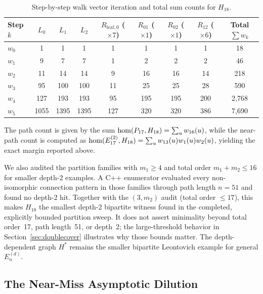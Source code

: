 \begin{table}[H]
\centering
\caption{Step-by-step walk vector iteration and total sum counts for $H_{18}$.}
\label{tab:walk_h18}
\begin{tabular}{lcccccccc}
  \toprule
  Step $k$ & $L_0$ & $L_1$ & $L_2$ & $R_{\mathrm{leaf},0}$ ($\times 7$) & $R_{01}$ ($\times 1$) & $R_{02}$ ($\times 1$) & $R_{12}$ ($\times 6$) & Total $\sum w_k$ \\
  \midrule
  $w_0$ & 1 & 1 & 1 & 1 & 1 & 1 & 1 & 18 \\
  $w_1$ & 9 & 7 & 7 & 1 & 2 & 2 & 2 & 46 \\
  $w_2$ & 11 & 14 & 14 & 9 & 16 & 16 & 14 & 218 \\
  $w_3$ & 95 & 100 & 100 & 11 & 25 & 25 & 28 & 590 \\
  $w_4$ & 127 & 193 & 193 & 95 & 195 & 195 & 200 & 2{,}768 \\
  $w_5$ & 1055 & 1395 & 1395 & 127 & 320 & 320 & 386 & 7{,}690 \\
  \bottomrule
\end{tabular}
\end{table}

The path count is given by the sum $\mathrm{hom}(P_{17}, H_{18}) = \sum_u w_{16}(u)$, while the near-path count
is computed as $\mathrm{hom}(E_{17}^{(2)}, H_{18}) = \sum_u w_{13}(u) w_1(u) w_2(u)$, yielding the exact margin reported above.

\begin{remark}
  We also audited the partition families with $m_1 \ge 4$ and total order
  $m_1+m_2\le 16$ for smaller depth-2 examples. A C++ enumerator evaluated
  every non-isomorphic connection pattern in those families through path
  length $n=51$ and found no depth-2 hit. Together with the $(3,m_2)$ audit
  (total order $\le 17$), this makes $H_{18}$ the smallest depth-2 bipartite
  witness found in the completed, explicitly bounded partition sweep. It does
  not assert minimality beyond total order~17, path length~51, or depth~2;
  the large-threshold behavior in Section~\ref{sec:doublecover} illustrates
  why those bounds matter. The depth-dependent graph $H^*$ remains the
  smaller bipartite Leontovich example for general $E_n^{(d)}$.
\end{remark}

\subsection{The Near-Miss Asymptotic Dilution}

